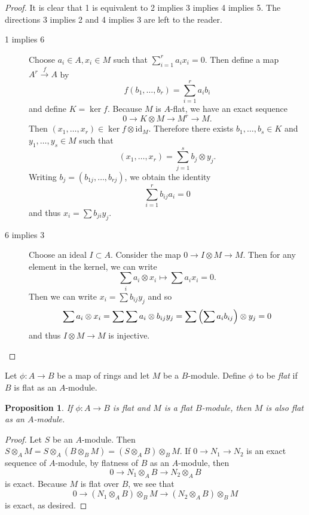 \documentclass[leqno, openany]{memoir}
\newtheorem{prop}[thm]{Proposition}
\theoremstyle{definition}
\theoremstyle{remark}
\theoremstyle{plain}
\theoremstyle{definition}
\theoremstyle{remark}
\newcommand{\mr}[1]{\mathrm{#1}}
\begin{document}
\begin{proof} It is clear that 1 is equivalent to 2 implies 3 implies 4 implies
    5. The directions 3 implies 2 and 4 implies 3 are left to the reader.
    \begin{description} \item[1 implies 6] Choose $a_i \in A, x_i \in M$ such
        that $\sum_{i=1}^r a_i x_i = 0$. Then define a map $A^r \xrightarrow{f}
        A$ by \[ f(b_1, \ldots, b_r) = \sum_{i=1}^r a_i b_i \] and define $K =
        \ker f$.  Because $M$ is $A$-flat, we have an exact sequence \[ 0 \to K
        \otimes M \to M^r \to M. \] Then $(x_1, \ldots, x_r) \in \ker f \otimes
        \mr{id}_M$. Therefore there exists $b_1, \ldots, b_s \in K$ and $y_1,
        \ldots, y_s \in M$ such that \[ (x_1, \ldots, x_r) = \sum_{j=1}^s b_j
            \otimes y_j. \] Writing $b_j = (b_{1j}, \ldots, b_{rj})$, we obtain
            the identity \[ \sum_{i=1}^r b_{ij} a_i = 0 \] and thus $x_i = \sum
            b_{ji} y_j$.  \item[6 implies 3] Choose an ideal $I \subset A$.
            Consider the map $0 \to I \otimes M \to M$. Then for any element in
            the kernel, we can write \[ \sum_i a_i \otimes x_i \mapsto \sum a_i
                x_i = 0. \] Then we can write $x_i = \sum b_{ij} y_j$ and so \[
            \sum a_i \otimes x_i = \sum \sum a_i \otimes b_{ij}y_j = \sum
        \qty(\sum a_i b_{ij}) \otimes y_j = 0 \] and thus $I \otimes M \to M$
is injective. \qedhere \end{description} \end{proof}

Let $\phi: A \to B$ be a map of rings and let $M$ be a $B$-module. Define
$\phi$ to be \textit{flat} if $B$ is flat as an $A$-module.

\begin{prop} If $\phi: A \to B$ is flat and $M$ is a flat $B$-module, then $M$
is also flat as an $A$-module.  \end{prop}

\begin{proof} Let $S$ be an $A$-module. Then $S \otimes_A M = S \otimes_A (B
    \otimes_B M) = (S \otimes_A B) \otimes_B M$. If $0 \to N_1 \to N_2$ is an
    exact sequence of $A$-module, by flatness of $B$ as an $A$-module, then \[
    0 \to N_1 \otimes_A B \to N_2 \otimes_A B\] is exact. Because $M$ is flat
    over $B$, we see that \[ 0 \to (N_1 \otimes_A B) \otimes_B M \to (N_2
    \otimes_A B) \otimes_B M \] is exact, as desired.  \end{proof}
\end{document}
